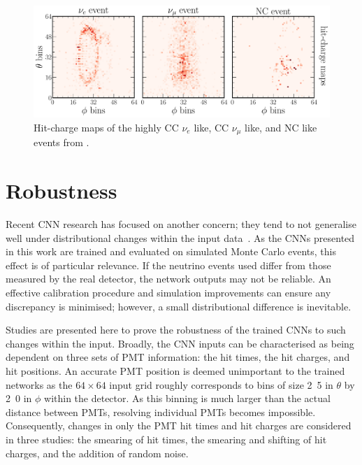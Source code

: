 \begin{figure} %
    \includegraphics[width=\textwidth]{diagrams/7-results/explain_beam_tsne_events.pdf}
    \caption[Hit-charge maps of highly CC $\nu_{e}$ like, CC $\nu_{\mu}$ like, and NC like events]
    {Hit-charge maps of the highly CC $\nu_{e}$ like, CC $\nu_{\mu}$ like, and NC like events from
        .}
    \label{fig:explain_beam_tsne_events}
\end{figure}

\section{Robustness} %
\label{sec:results_robust} %

Recent CNN research has focused on another concern; they tend to not generalise well under
distributional changes within the input data~\cite{djolonga2020}. As the CNNs presented in this
work are trained and evaluated on simulated Monte Carlo events, this effect is of particular
relevance. If the neutrino events used differ from those measured by the real \chipsfive detector,
the network outputs may not be reliable. An effective calibration procedure and simulation
improvements can ensure any discrepancy is minimised; however, a small distributional difference
is inevitable.

Studies are presented here to prove the robustness of the trained CNNs to such changes within the
input. Broadly, the CNN inputs can be characterised as being dependent on three sets of PMT
information: the hit times, the hit charges, and hit positions. An accurate PMT position is deemed
unimportant to the trained networks as the $64 \times 64$ input grid roughly corresponds to bins
of size \unit{2.5}{} in $\theta$ by \unit{2.0}{} in $\phi$ within the \chipsfive
detector. As this binning is much larger than the actual distance between PMTs, resolving
individual PMTs becomes impossible. Consequently, changes in only the PMT hit times and hit
charges are considered in three studies: the smearing of hit times, the smearing and shifting of
hit charges, and the addition of random noise.

